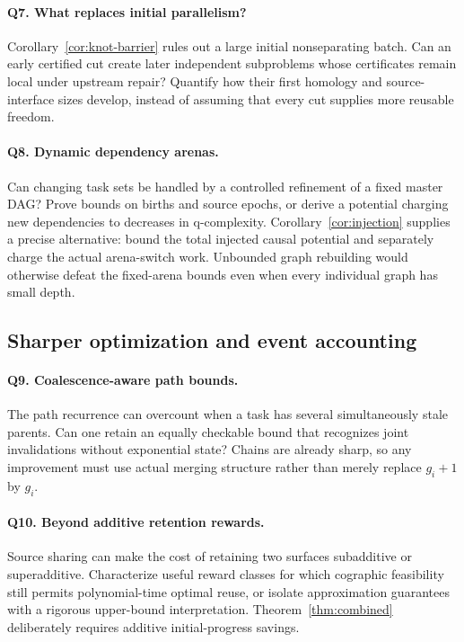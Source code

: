 \documentclass[11pt]{article}
\theoremstyle{definition}
\begin{document}
\paragraph{Q7. What replaces initial parallelism?}
Corollary~\ref{cor:knot-barrier} rules out a large initial nonseparating batch. Can an early certified cut create later independent subproblems whose certificates remain local under upstream repair? Quantify how their first homology and source-interface sizes develop, instead of assuming that every cut supplies more reusable freedom.

\paragraph{Q8. Dynamic dependency arenas.}
Can changing task sets be handled by a controlled refinement of a fixed master DAG? Prove bounds on births and source epochs, or derive a potential charging new dependencies to decreases in q-complexity. Corollary~\ref{cor:injection} supplies a precise alternative: bound the total injected causal potential and separately charge the actual arena-switch work. Unbounded graph rebuilding would otherwise defeat the fixed-arena bounds even when every individual graph has small depth.

\subsection{Sharper optimization and event accounting}
\paragraph{Q9. Coalescence-aware path bounds.}
The path recurrence can overcount when a task has several simultaneously stale parents. Can one retain an equally checkable bound that recognizes joint invalidations without exponential state? Chains are already sharp, so any improvement must use actual merging structure rather than merely replace $g_i+1$ by $g_i$.

\paragraph{Q10. Beyond additive retention rewards.}
Source sharing can make the cost of retaining two surfaces subadditive or superadditive. Characterize useful reward classes for which cographic feasibility still permits polynomial-time optimal reuse, or isolate approximation guarantees with a rigorous upper-bound interpretation. Theorem~\ref{thm:combined} deliberately requires additive initial-progress savings.
\end{document}
